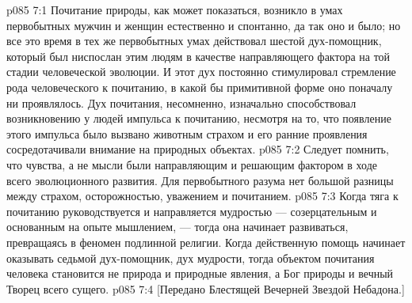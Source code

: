\vs p085 7:1 Почитание природы, как может показаться, возникло в умах первобытных мужчин и женщин естественно и спонтанно, да так оно и было; но все это время в тех же первобытных умах действовал шестой дух\hyp{}помощник, который был ниспослан этим людям в качестве направляющего фактора на той стадии человеческой эволюции. И этот дух постоянно стимулировал стремление рода человеческого к почитанию, в какой бы примитивной форме оно поначалу ни проявлялось. Дух почитания, несомненно, изначально способствовал возникновению у людей импульса к почитанию, несмотря на то, что появление этого импульса было вызвано животным страхом и его ранние проявления сосредотачивали внимание на природных объектах.
\vs p085 7:2 Следует помнить, что чувства, а не мысли были направляющим и решающим фактором в ходе всего эволюционного развития. Для первобытного разума нет большой разницы между страхом, осторожностью, уважением и почитанием.
\vs p085 7:3 Когда тяга к почитанию руководствуется и направляется мудростью --- созерцательным и основанным на опыте мышлением, --- тогда она начинает развиваться, превращаясь в феномен подлинной религии. Когда действенную помощь начинает оказывать седьмой дух\hyp{}помощник, дух мудрости, тогда объектом почитания человека становится не природа и природные явления, а Бог природы и вечный Творец всего сущего.
\vsetoff
\vs p085 7:4 [Передано Блестящей Вечерней Звездой Небадона.]

